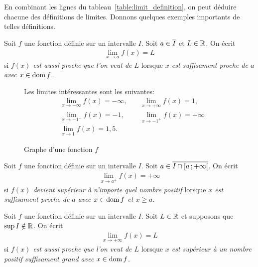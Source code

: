 \documentclass[main.tex]{subfiles}
\begin{document}
En combinant les lignes du tableau~\ref{table:limit_definition},
on peut déduire chacune des définitions de limites.
Donnons quelques exemples importants de telles définitions.

\begin{definition}

    Soit $f$ une fonction définie sur un intervalle $I$.
    Soit $a \in \overline{I}$ et $L \in \mathbb{R}$.
    On écrit
    \begin{align}
        \lim_{x \to a} f(x) = L
    \end{align}
    si \emph{$f(x)$ est aussi proche que l'on veut de $L$}
    lorsque \emph{$x$ est suffisament proche de $a$ avec $x \in \operatorname{dom} f$}.
\end{definition}

\begin{figure}
    \centering
    \begin{plot}{0.25}{-10}{-10}{10}{10}
    \end{plot}
    \caption{Graphe d'une fonction $f$}
    Les limites intéressantes sont les suivantes:
    \begin{align}
        &\lim_{x \to -\infty} f(x) = -\infty, \quad
        &\lim_{x \to +\infty} f(x) = 1,\\
        &\lim_{x \to -1^-} f(x) = -1, \quad
        &\lim_{x \to -1^+} f(x) = +\infty\\
        &\lim_{x \to 1} f(x) = 1,5.
    \end{align}
\end{figure}

\begin{definition}

    Soit $f$ une fonction définie sur un intervalle $I$.
    Soit $a \in \overline{I \cap \mathopen{[}a\,;+\infty\mathclose{[}}$.
    On écrit
    \begin{align}
        \lim_{x \to a^+} f(x) = +\infty
    \end{align}
    si \emph{$f(x)$ devient supérieur à n'importe quel nombre positif}
    lorsque \emph{$x$ est suffisament proche de $a$ avec $x \in \operatorname{dom} f$ et $x \geq a$}.
\end{definition}

\begin{definition}

    Soit $f$ une fonction définie sur un intervalle $I$.
    Soit $L \in \mathbb{R}$ et supposons que $\sup I \notin \mathbb{R}$.
    On écrit
    \begin{align}
        \lim_{x \to +\infty} f(x) = L
    \end{align}
    si \emph{$f(x)$ est aussi proche que l'on veut de $L$}
    lorsque \emph{$x$ est supérieur à un nombre positif suffisament grand avec $x \in \operatorname{dom} f$}.
\end{definition}
\end{document}
